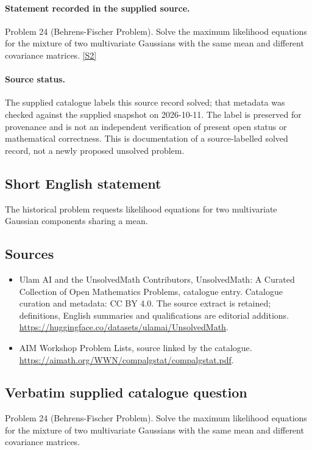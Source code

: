 \documentclass[11pt]{article}
\begin{document}
\paragraph{Statement recorded in the supplied source.}
Problem 24 (Behrens-Fischer Problem). Solve the maximum likelihood equations for the mixture of two multivariate Gaussians with the same mean and different covariance matrices. \href{https://aimath.org/WWN/compalgstat/compalgstat.pdf}{[S2]}
\paragraph{Source status.}
The supplied catalogue labels this source record solved; that metadata was checked against the supplied snapshot on 2026-10-11. The label is preserved for provenance and is not an independent verification of present open status or mathematical correctness. This is documentation of a source-labelled solved record, not a newly proposed unsolved problem.
\subsection{Short English statement}
The historical problem requests likelihood equations for two multivariate Gaussian components sharing a mean.
\subsection{Sources}
\begin{itemize}
\item[S1] Ulam AI and the UnsolvedMath Contributors, UnsolvedMath: A Curated Collection of Open Mathematics Problems, catalogue entry. Catalogue curation and metadata: CC BY 4.0. The source extract is retained; definitions, English summaries and qualifications are editorial additions.
\url{https://huggingface.co/datasets/ulamai/UnsolvedMath}.
\item[S2] AIM Workshop Problem Lists, source linked by the catalogue.
\url{https://aimath.org/WWN/compalgstat/compalgstat.pdf}.
\end{itemize}
\subsection{Verbatim supplied catalogue question}
Problem 24 (Behrens-Fischer Problem). Solve the maximum likelihood equations for the mixture of two multivariate Gaussians with the same mean and different covariance matrices.
\end{document}
